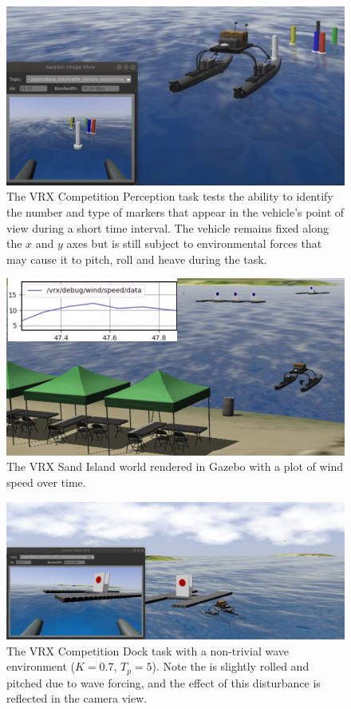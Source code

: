 \documentclass[utf8]{frontiersSCNS} %
\begin{document}
\begin{figure}[hbt!]
  \centering
  \includegraphics[width=\FigWidth\textwidth]{images/perception_task.png}
  \caption{The VRX Competition Perception task tests the ability to identify the number and type of markers that appear in the vehicle's point of view during a short time interval. The vehicle remains fixed along the $x$ and $y$ axes but is still subject to environmental forces that may cause it to pitch, roll and heave during the task.}
  \label{f:perception_waves}
\end{figure}

\begin{figure}[hbt!]
  \centering
  \includegraphics[width=\FigWidth\textwidth]{images/sand_island_beach_wind.png}
  \caption{The VRX Sand Island world rendered in Gazebo with a plot of wind speed over time.}
  \label{f:sandisland_wind}
\end{figure}

\begin{figure}[hbt!]
  \centering
  \includegraphics[width=\FigWidth\textwidth]{images/waves_sync.png}
  \caption{The VRX Competition Dock task with a non-trivial wave environment ($K = 0.7$, $T_p = 5$). Note the \wamv{} is slightly rolled and pitched due to wave forcing, and the effect of this disturbance is reflected in the camera view.}
  \label{f:dock_waves}
\end{figure}
\end{document}
